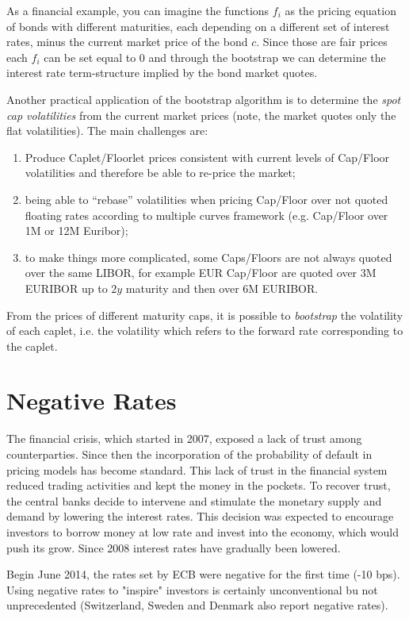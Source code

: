 \documentclass[12pt,a4paper]{book}
\begin{document}
As a financial example, you can imagine the functions $f_i$ as the pricing equation of bonds with different maturities, each depending on a different set of interest rates, minus the current market price of the bond $c$. Since those are fair prices each $f_i$ can be set equal to 0 and through the bootstrap we can determine the interest rate term-structure implied by the bond market quotes. 

Another practical application of the bootstrap algorithm is to determine the \emph{spot cap volatilities} from the current market prices (note, the market quotes only the flat volatilities).
The main challenges are:
\begin{enumerate}
		\item Produce Caplet/Floorlet prices consistent with current levels of Cap/Floor volatilities and therefore be able to re-price the market;
	\item being able to “rebase” volatilities when pricing Cap/Floor over not quoted floating rates according to multiple curves framework (e.g. Cap/Floor over 1M or 12M Euribor);
	\item to make things more complicated, some Caps/Floors are not always quoted over the same LIBOR, for example EUR Cap/Floor are quoted over 3M EURIBOR up to $2y$ maturity and then over 6M EURIBOR.
\end{enumerate}

From the prices of different maturity caps, it is possible to \emph{bootstrap} the volatility of each caplet, i.e. the volatility which refers to the forward rate corresponding to the caplet.

\section{Negative Rates}

The financial crisis, which started in 2007, exposed a lack of trust among counterparties. Since then the incorporation of the probability of default in pricing models has become standard.
This lack of trust in the financial system reduced trading activities and kept the money in the pockets.
To recover trust, the central banks decide to intervene and stimulate the monetary supply and demand by lowering the interest rates.
This decision was expected to encourage investors to borrow money at low rate and invest into the economy, which would push its grow. Since 2008 interest rates have gradually been lowered.

Begin June 2014, the rates set by ECB were negative for the first time (-10 bps). Using negative rates to "inspire" investors is certainly unconventional bu not unprecedented (Switzerland, Sweden and Denmark also report negative rates).
\end{document}
